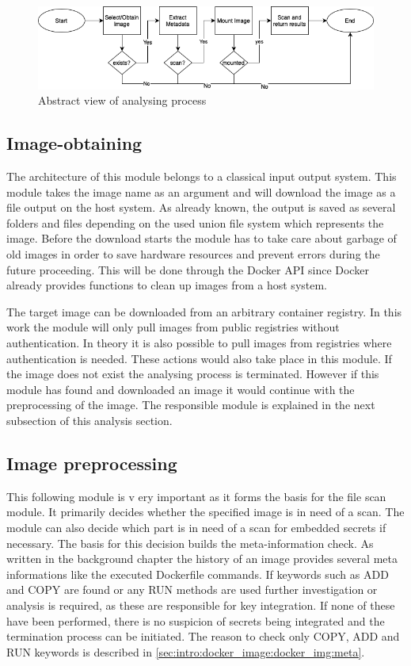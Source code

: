 \begin{figure}[htbp]
\centering
\includegraphics[width=1.0\textwidth]{gfx/examples/basic_workflow_scan}
\caption{Abstract view of analysing process}
\label{ch:theory:analysing process:fig}
\end{figure}

\subsection{Image-obtaining}
\label{ch:theory:analysing_process:obtain}
The architecture of this module belongs to a classical input output system. This module takes the image name as an argument and will download the image as a file output on the host system. As already known, the output is saved as several folders and files depending on the used union file system which represents the image. Before the download starts the module has to take care about garbage of old images in order to save hardware resources and prevent errors during the future proceeding. This will be done through the Docker API since Docker already provides functions to clean up images from a host system.

The target image can be downloaded from an arbitrary container registry. In this work the module will only pull images from public registries without authentication. In theory it is also possible to pull images from registries where authentication is needed. These actions would also take place in this module.
If the image does not exist the analysing process is terminated.
However if this module has found and downloaded an image it would continue with the preprocessing of the image. The responsible module is explained in the next subsection of this analysis section.

\subsection{Image preprocessing}
\label{ch:theory:analysing_process:prepro}
This following module is v	ery important as it forms the basis for the file scan module. It primarily decides whether the specified image is in need of a scan. The module can also decide which part is in need of a scan for embedded secrets if necessary. The basis for this decision builds the meta-information check. As written in the background chapter the history of an image provides several meta informations like the executed Dockerfile commands.
If keywords such as ADD and COPY are found or any RUN methods are used further investigation or analysis is required, as these are responsible for key integration. If none of these have been performed, there is no suspicion of secrets being integrated and the termination process can be initiated.
The reason to check only COPY, ADD and RUN keywords is described in \ref{sec:intro:docker_image:docker_img:meta}. 


